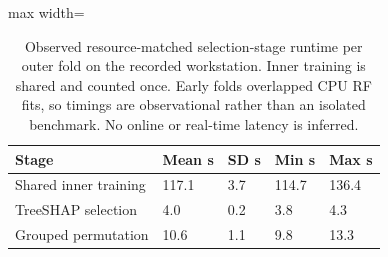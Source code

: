 \begin{table}[htbp]
\centering\small
\caption{Observed resource-matched selection-stage runtime per outer fold on the recorded workstation. Inner training is shared and counted once. Early folds overlapped CPU RF fits, so timings are observational rather than an isolated benchmark. No online or real-time latency is inferred.}\label{tab:costs}
\begin{adjustbox}{max width=\textwidth}
\begin{tabular}{lllll}\toprule
Stage & Mean s & SD s & Min s & Max s\\\midrule
Shared inner training & 117.1 & 3.7 & 114.7 & 136.4\\
TreeSHAP selection & 4.0 & 0.2 & 3.8 & 4.3\\
Grouped permutation & 10.6 & 1.1 & 9.8 & 13.3\\
\bottomrule\end{tabular}
\end{adjustbox}
\end{table}
